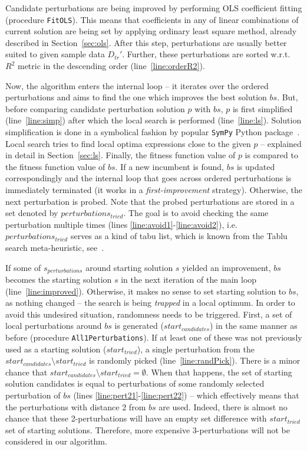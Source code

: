 \documentclass[a4paper,12pt]{elsarticle}
\begin{document}
Candidate perturbations are being improved by performing OLS coefficient fitting (procedure \texttt{FitOLS}). This means that coefficients in any of linear combinations of current solution are being set by applying  ordinary least square method, already described in Section~\ref{sec:ols}.   
After this step, perturbations are usually better suited to given sample data $D_{tr}'$. 
Further, these perturbations are sorted w.r.t. $R^2$ metric in the descending order (line~\ref{line:orderR2}). 

Now, the algorithm enters the internal loop -- it iterates over the ordered perturbations and aims to find the one which improves the best solution $bs$. But, before comparing candidate perturbation solution $p$ with $bs$, $p$ is first simplified (line~\ref{line:simp}) after which the local search is performed (line~\ref{line:ls}).
Solution simplification is done in a symbolical fashion by popular \texttt{SymPy} Python package~\cite{sympy}.
Local search tries to find local optima expressions close to the given $p$ -- explained in detail in Section~\ref{sec:ls}.  
Finally, the fitness function value of $p$ is compared to the fitness function value of $bs$. If a new incumbent is found, $bs$ is updated correspondingly and the internal loop that goes across ordered perturbations is immediately terminated (it works in a  \emph{first-improvement} strategy). Otherwise, the next perturbation is probed. 
Note that the probed perturbations are stored in a set denoted by $perturbations_{tried}$. The goal is to avoid checking the same perturbation multiple times (lines \ref{line:avoid1}-\ref{line:avoid2}), i.e. $perturbations_{tried}$ serves as a kind of tabu list, which is known from the Tablu search meta-heuristic, see~\cite{glover1998tabu}.    


If some of $s_{perturbations}$ around starting solution $s$ yielded an improvement, $bs$ becomes the starting solution $s$ in the next iteration of the main loop (line~\ref{line:improved}). 
Otherwise, it makes no sense to set starting solution to $bs$, as nothing changed -- the search is being  \emph{trapped} in a local optimum. In order to avoid this undesired situation, randomness needs to be triggered. First, a set of local perturbations around $bs$ is generated ($start_{candidates}$) in the same manner as before (procedure \texttt{All1Perturbations}). If at least one of these was not previously used as a starting solution ($start_{tried}$), a single perturbation from the $start_{candidates} \setminus start_{tried}$ is randomly picked (line~\ref{line:randPick}). There is a minor chance that $start_{candidates} \setminus start_{tried} = \emptyset$. When that happens, the set of starting solution candidates is equal to perturbations of some randomly selected perturbation of $bs$ (lines \ref{line:pert21}-\ref{line:pert22}) -- which effectively means that the perturbations with distance 2 from $bs$ are used. Indeed, there is almost no chance that these 2-perturbations will have an empty set difference with $start_{tried}$ set of starting solutions. Therefore, more expensive 3-perturbations will not be considered in our algorithm. 
\end{document}
